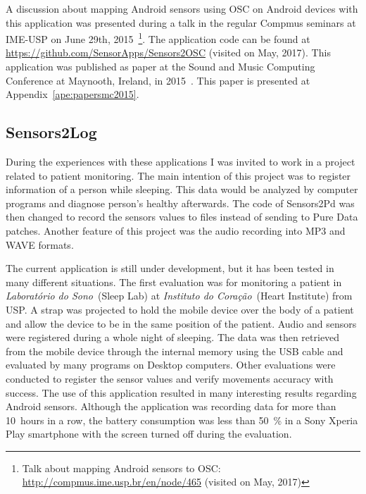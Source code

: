 A discussion about mapping Android sensors using OSC on Android devices with this application was presented during a talk in the regular Compmus seminars at IME-USP on June 29th, 2015~\footnote{Talk about mapping Android sensors to OSC: \url{http://compmus.ime.usp.br/en/node/465} (visited on May, 2017)}.
The application code can be found at \url{https://github.com/SensorApps/Sensors2OSC} (visited on May, 2017).
This application was published as paper at the Sound and Music Computing Conference at Maynooth, Ireland, in 2015~\citep{deCarvalhoJunior2015sensors2osc}.
This paper is presented at Appendix~\ref{ape:papersmc2015}.

\subsection*{Sensors2Log}
\label{apesubsec:appsensors2log}

During the experiences with these applications I was invited to work in a project related to patient monitoring. %
The main intention of this project was to register information of a person while sleeping.
This data would be analyzed by computer programs and diagnose person's healthy afterwards.
The code of Sensors2Pd was then changed to record the sensors values to files instead of sending to Pure Data patches.
Another feature of this project was the audio recording into MP3 and WAVE formats.

The current application is still under development, but it has been tested in many different situations.
The first evaluation was for monitoring a patient in \textit{Laboratório do Sono}~(Sleep Lab) at \textit{Instituto do Coração}~(Heart Institute) from USP.
A strap was projected to hold the mobile device over the body of a patient and allow the device to be in the same position of the patient.
Audio and sensors were registered during a whole night of sleeping.
The data was then retrieved from the mobile device through the internal memory using the USB cable and evaluated by many programs on Desktop computers.
Other evaluations were conducted to register the sensor values and verify movements accuracy with success.
The use of this application resulted in many interesting results regarding Android sensors.
Although the application was recording data for more than 10~hours in a row, the battery consumption was less than 50~\% in a Sony Xperia Play smartphone with the screen turned off during the evaluation.

